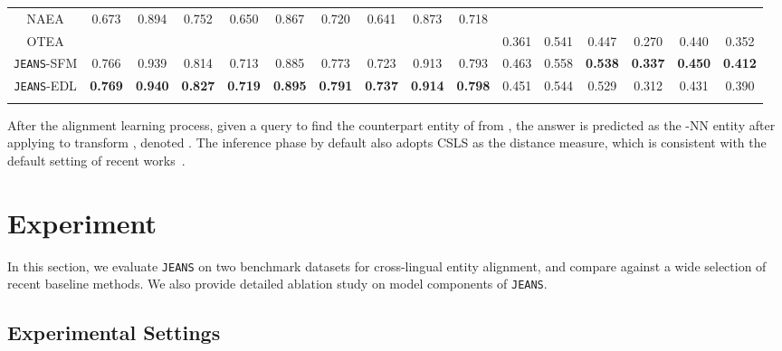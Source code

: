 \documentclass[11pt,a4paper]{article}
\newcommand{\modelname}[0]{\texttt{JEANS}\xspace}
\def\bhline{\specialrule{.2em}{0em}{0em}}
\begin{document}
{\begin{table*}[t]
\begin{tabular}{c|ccc|ccc|ccc|ccc|ccc}
NAEA \cite{zhu2019neighborhood}&0.673&0.894&0.752&0.650&0.867&0.720&0.641&0.873&0.718&&&&&&\\
OTEA \cite{pei2019transport}&&&&&&&&&&0.361&0.541&0.447&0.270&0.440&0.352\\
\hline
\modelname-SFM&0.766&0.939&0.814&0.713&0.885&0.773&0.723&0.913&0.793&0.463&0.558&\textbf{0.538}&\textbf{0.337}&\textbf{0.450}&\textbf{0.412}\\
\modelname-EDL&\textbf{0.769}&\textbf{0.940}&\textbf{0.827}&\textbf{0.719}&\textbf{0.895}&\textbf{0.791}&\textbf{0.737}&\textbf{0.914}&\textbf{0.798}&0.451&0.544&0.529&0.312&0.431&0.390\\
\bhline
\end{tabular}
\caption{Entity alignment results. Baselines are separated in accord with the three groups described in Section~\ref{sec:exp_set}.  indicates results obtained from \cite{sun2020alinet}, and  indicates those from \cite{pei2019transport}. Results of KECG, GCN-JE, MMR, HMAN, KDCoE and NAEA are from original papers. Hyphens denote not available.
MRR were not reported by GCN-JE, MMR and HMAN. Top results (incl. w/ and w/o seed lexicon) are boldfaced.
Note that results by GCN-JE, GMN and HMAN are reported only for the versions where the extra cross-lingual alignment information (such as machine translation) is removed, so as to conduct fair comparison with all the rest models that are trained using only the alignment labels in the benchmark training sets.
}\label{tbl:entity}
\end{table*}
}
 


After the alignment learning process, given a query  to find the counterpart entity of  from ,
the answer  is predicted as the -NN entity after applying  to transform , denoted .
The inference phase by default also adopts CSLS as the distance measure, which is consistent with the default setting of recent works~\cite{sun2019transedge,sun2020alinet}.
%
 \section{Experiment}\label{sec:exp}

In this section, we evaluate \modelname on two benchmark datasets for cross-lingual entity alignment, and compare against a wide selection of recent baseline methods.
We also provide detailed ablation study on model components of \modelname.



\subsection{Experimental Settings}\label{sec:exp_set}
\end{document}
